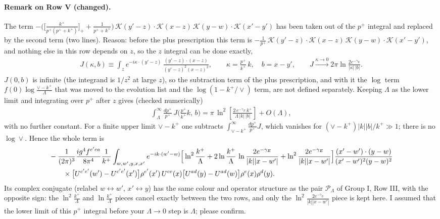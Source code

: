 \documentclass[9pt]{article}
\numberwithin{equation}{section}
\begin{document}
{\color{red}
\paragraph{Remark on Row V (changed).}
The term $-\Big(\big[\frac{k^{+}}{p^{+}(p^{+}+k^{+})}\big]_{+}+\frac{1}{p^{+}+k^{+}}\Big)\,\mathcal{K}(y'-z)\cdot\mathcal{K}(x-z)\,\mathcal{K}(y-w)\cdot\mathcal{K}(x'-y')$ has been taken out of the $p^{+}$ integral and replaced by the second term (two lines). Reason: before the plus prescription this term is $-\frac{1}{p^{+}}\,\mathcal{K}(y'-z)\cdot\mathcal{K}(x-z)\,\mathcal{K}(y-w)\cdot\mathcal{K}(x'-y')$, and nothing else in this row depends on $z$, so the $z$ integral can be done exactly,
\begin{align}
J(\kappa,b)\equiv\int_{z}e^{-i\kappa\cdot(y'-z)}\,\frac{(y'-z)\cdot(x-z)}{(y'-z)^{2}(x-z)^{2}},\qquad \kappa=\frac{p^{+}}{k^{+}}\,k,\quad b=x-y',\qquad J\xrightarrow{\kappa\to0}2\pi\ln\frac{2e^{-\gamma_{E}}}{|\kappa|\,|b|}.
\end{align}
$J(0,b)$ is infinite (the integrand is $1/z^{2}$ at large $z$), so the subtraction term of the plus prescription, and with it the $\log$ term $f(0)\log\frac{\vee-k^{+}}{\Lambda}$ that was moved to the evolution list and the $\log(1-k^{+}/\vee)$ term, are not defined separately. Keeping $\Lambda$ as the lower limit and integrating over $p^{+}$ after $z$ gives (checked numerically)
\begin{align}
\int_{\Lambda}^{\infty}\frac{dp^{+}}{p^{+}}\,J\Big(\frac{p^{+}}{k^{+}}k,\,b\Big)=\pi\,\ln^{2}\!\left[\frac{2\,e^{-\gamma_{E}}\,k^{+}}{\Lambda\,|k|\,|b|}\right]+O(\Lambda),
\end{align}
with no further constant. For a finite upper limit $\vee-k^{+}$ one subtracts $\int_{\vee-k^{+}}^{\infty}\frac{dp^{+}}{p^{+}}J$, which vanishes for $(\vee-k^{+})|k||b|/k^{+}\gg1$; there is no $\log\vee$. Hence the whole term is
\begin{align}
&-\frac{1}{(2\pi)^{3}}\frac{ig^{4}f^{c'ca}}{8\pi^{4}}\frac{1}{k^{+}}\int_{w,w',y,x,x'} e^{-ik\cdot(w'-w)}\Big[\ln^{2}\frac{k^{+}}{\Lambda}+2\ln\frac{k^{+}}{\Lambda}\,\ln\frac{2e^{-\gamma_{E}}}{|k||x-w'|}+\ln^{2}\frac{2e^{-\gamma_{E}}}{|k||x-w'|}\Big]\frac{(x'-w')\cdot(y-w)}{(x'-w')^{2}(y-w)^{2}}\notag\\
&\qquad\times\big[U^{c'e'}(w')-U^{c'e'}(x')\big]\rho^{e'}(x')\,U^{ce}(x)\big[U^{ad}(y)-U^{ad}(w)\big]\rho^{e}(x)\rho^{d}(y).
\end{align}
Its complex conjugate (relabel $w\leftrightarrow w'$, $x'\leftrightarrow y$) has the same colour and operator structure as the pair $\mathcal{P}_{\Lambda}$ of Group I, Row III, with the opposite sign: the $\ln^{2}\frac{k^{+}}{\Lambda}$ and $\ln\frac{k^{+}}{\Lambda}$ pieces cancel exactly between the two rows, and only the $\ln^{2}\frac{2e^{-\gamma_{E}}}{|k||x-w'|}$ piece is kept here. I assumed that the lower limit of this $p^{+}$ integral before your $\Lambda\to0$ step is $\Lambda$; please confirm.
}
\end{document}
